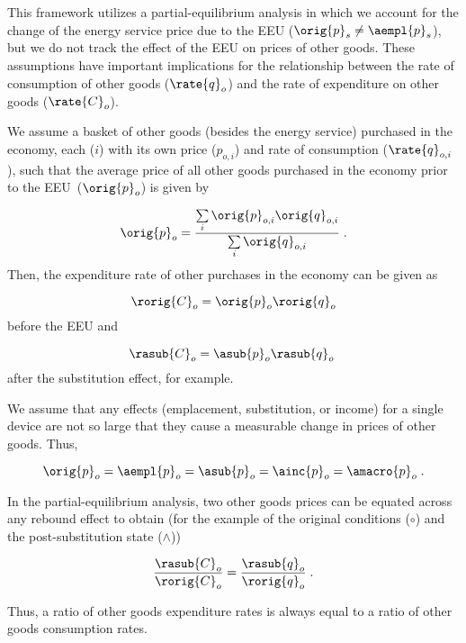 

This framework utilizes
a partial-equilibrium analysis
in which we account for the change of the energy service price
due to the EEU ($\orig{p}_s \neq \aempl{p}_s$), but 
we do not track the effect of the EEU on prices of other goods.
These assumptions have important implications for the relationship between 
the rate of consumption of other goods ($\rate{q}_o$) and 
the rate of expenditure on other goods ($\rate{C}_o$).

We assume a basket of other goods (besides the energy service) 
purchased in the economy,
each ($i$) with its own price ($p_{o,i}$) and rate of consumption ($\rate{q}_{o,i}$),
such that the average price of all other goods purchased in the economy
prior to the EEU~($\orig{p}_o$) is given by

\begin{equation}
  \orig{p}_o = \frac{\sum\limits_i \orig{p}_{o,i} \orig{q}_{o,i}}{\sum\limits_i \orig{q}_{o,i}} \; .
\end{equation}
%
Then, the expenditure rate of other purchases in the economy can be given as

\begin{equation}
  \rorig{C}_o = \orig{p}_o \rorig{q}_o
\end{equation}
%
before the EEU and

\begin{equation}
  \rasub{C}_o = \asub{p}_o \rasub{q}_o \; 
\end{equation}
%
after the substitution effect, for example.

We assume that any effects (emplacement, substitution, or income)
for a single device 
are not so large that they 
cause a measurable change in prices of other goods. 
Thus, 

\begin{equation}
  \orig{p}_o = \aempl{p}_o = \asub{p}_o = \ainc{p}_o = \amacro{p}_o \; .
\end{equation}

In the partial-equilibrium analysis, 
two other goods prices can be equated 
across any rebound effect
to obtain
(for the example of the original conditions ($\circ$) 
and the post-substitution state ($\wedge$))

\begin{equation} \label{eq:qo_Co_equality}
  \frac{\rasub{C}_o}{\rorig{C}_o} 
      = \frac{\rasub{q}_o}{\rorig{q}_o} \; .
\end{equation}

Thus, a ratio of other goods expenditure rates
is always equal to a ratio of other goods consumption rates.









